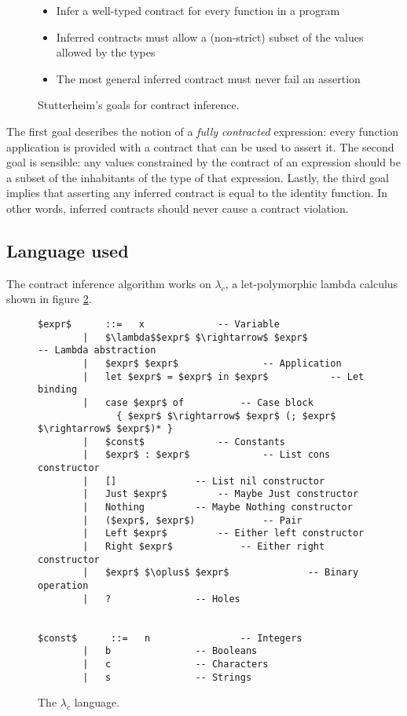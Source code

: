 \documentclass[10pt]{report}
\begin{document}
\begin{figure}[htps]
\begin{framed}
\begin{center}
\begin{itemize}
	\item Infer a well-typed contract for every function in a program
	\item Inferred contracts must allow a (non-strict) subset of the values allowed
by the types
	\item The most general inferred contract must never fail an assertion
\end{itemize}
\end{center}
\end{framed}
\caption{\label{fig:goals-stutterheim-contract-inference}Stutterheim's goals for contract inference.}
\end{figure}

The first goal describes the notion of a \textit{fully contracted} expression: every function application is provided with a contract that can be used to assert it.
The second goal is sensible: any values constrained by the contract of an expression should be a subset of the inhabitants of the type of that expression.
Lastly, the third goal implies that asserting any inferred contract is equal to the identity function.
In other words, inferred contracts should never cause a contract violation.

\subsection{Language used}

The contract inference algorithm works on $\lambda_c$, a let-polymorphic lambda calculus shown in figure \ref{stutterheim-lambda-language}.

\begin{figure}[htps]
\begin{lstlisting}[mathescape]
$expr$      ::=   x				-- Variable
        |   $\lambda$$expr$ $\rightarrow$ $expr$				-- Lambda abstraction
        |   $expr$ $expr$				-- Application
        |   let $expr$ = $expr$ in $expr$			-- Let binding
        |   case $expr$ of			-- Case block
              { $expr$ $\rightarrow$ $expr$ (; $expr$ $\rightarrow$ $expr$)* }
        |   $const$				-- Constants
        |   $expr$ : $expr$				-- List cons constructor
        |   []				-- List nil constructor
        |   Just $expr$			-- Maybe Just constructor
        |   Nothing			-- Maybe Nothing constructor
        |   ($expr$, $expr$)			-- Pair
        |   Left $expr$			-- Either left constructor
        |   Right $expr$			-- Either right constructor
        |   $expr$ $\oplus$ $expr$				-- Binary operation
        |   ?				-- Holes


$const$      ::=   n				-- Integers
        |   b				-- Booleans
        |   c				-- Characters
        |   s				-- Strings
\end{lstlisting}
\caption{\label{stutterheim-lambda-language}The $\lambda_c$ language.}
\end{figure}
\end{document}
